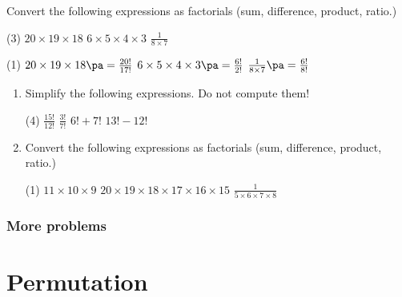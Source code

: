 \begin{frame}[t]
\begin{ex}
Convert the following expressions as factorials (sum, difference, product, ratio.)
\begin{tasks}(3)
\task $20 \times 19 \times 18$
\task $6 \times 5 \times 4 \times 3$
\task $\frac{1}{8 \times 7}$
\end{tasks}
\end{ex} \pa
\begin{sol}
\begin{tasks}(1)
\task $20 \times 19 \times 18 \pa =\frac{20!}{17!}$
\task $6 \times 5 \times 4 \times 3 \pa = \frac{6!}{2!}$
\task $\frac{1}{8 \times 7} \pa = \frac{6!}{8!}$
\end{tasks}
\end{sol}
\end{frame}

\begin{frame}
\begin{exercisebox}{}{}
\begin{enumerate}
\item Simplify the following expressions. Do not compute them!
\begin{tasks}(4)
\task $\frac{15!}{12!}$
\task $\frac{3!}{7!}$
\task $6! + 7!$
\task $13! - 12!$
\end{tasks}
\item Convert the following expressions as factorials (sum, difference, product, ratio.)
\begin{tasks}(1)
\task $11 \times 10 \times 9$
\task $20 \times 19 \times 18 \times 17 \times 16 \times 15$
\task $\frac{1}{5 \times 6 \times 7 \times 8}$
\end{tasks}
\end{enumerate}
\end{exercisebox}
\end{frame}

\begin{frame}
\frametitle{More problems}
\end{frame}


\section{Permutation}
\frame{\sectionpage}

